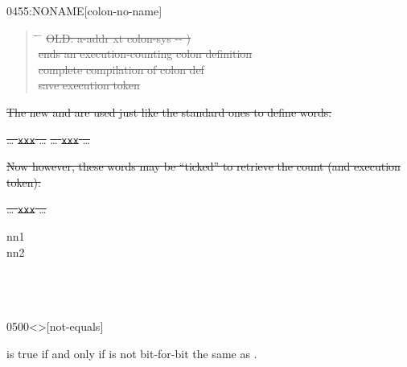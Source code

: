 \begin{worddef}{0455}{:NONAME}[colon-no-name]
\begin{rationale}
		\begin{quote}\ttfamily
		  \begin{tabbing}
			\tab \= \tab \= \hspace*{12em} \= \kill
			\sout{OLD: \word{;}  a-addr xt colon-sys -{}- )} \\
			\+ \sout{ ends an execution-counting colon definition} \\
				\sout{ \word{;}}										\>\> \sout{ complete compilation of colon def} \\
			\-	\sout{  \word{!}}								\>\> \sout{ save execution token} \\
			\sout{\word{;} }
		  \end{tabbing}
		\end{quote}

\sout{%
		The new \word{:} and \word{;} are used just like the standard
		ones to define words:}

		\tab \sout{{\ldots} \word{:} \texttt{xxx} {\ldots} \word{;}}
			\sout{{\ldots} \texttt{xxx} {\ldots}}

\sout{%
		Now however, these words may be ``ticked'' to retrieve the
		count (and execution token):}

		\tab \sout{{\ldots}  \texttt{xxx}   {\ldots}}
\cbend
	\end{rationale}

	\begin{testing}
	 nn1 \\
	 nn2 \\
	 \\
	 \\
	 \\
	\end{testing}
\end{worddef}


\begin{worddef}[ne]{0500}{<>}[not-equals]
\item {}

	 is true if and only if  is not bit-for-bit
	the same as .
\end{worddef}


